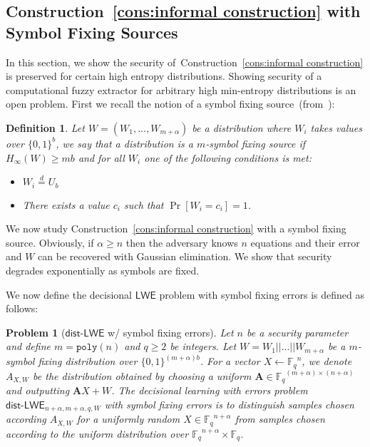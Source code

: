 \documentclass[11pt]{article}
\newcommand{\consref}[1]{\mbox{Construction~\ref{#1}}}
\newcommand{\class}[1]{{\ensuremath{\mathsf{#1}}}}
\newcommand{\vect}[1]{\ensuremath{\textbf{#1}}}
\newcommand{\Fq}{\ensuremath{\mathbb{F}_q}}
\newcommand{\poly}{\ensuremath{\mathtt{poly}}\xspace}
\newcommand{\LWE}{\class{LWE}}
\newcommand{\distLWE}{\ensuremath{\class{dist\mbox{-}LWE}}}
\newtheorem{definition}[theorem]{Definition}
\newtheorem{assumption}[theorem]{Assumption}
\newtheorem{problem}[theorem]{Problem}
\newcommand{\vA}{\vect{A}}
\newcommand{\ignore}[1]{}
\begin{document}
\subsection{\consref{cons:informal construction} with Symbol Fixing Sources}
\label{sec:LWE block fixing sources}
In this section, we show the security of~\consref{cons:informal construction} is preserved for certain high entropy distributions.  Showing security of a computational fuzzy extractor for arbitrary high min-entropy distributions is an open problem.  First we recall the notion of a symbol fixing source~(from~\cite{KZ07}): 
\begin{definition}
Let $W = (W_1,..., W_{m+\alpha})$ be a distribution where $W_i$ takes values over $\{0,1\}^b$, we say that a distribution is a $m$-\emph{symbol fixing source} if $H_\infty(W)\geq mb$ and for all $W_i$ one of the following conditions is met:
\begin{itemize}
\item $W_i \overset{d}= U_b$
\item There exists a value $c_i$ such that $\Pr[W_i = c_i] =1$.
\end{itemize}
\end{definition}

We now study \consref{cons:informal construction} with a symbol fixing source.  Obviously, if $\alpha \geq n$ then the adversary knows $n$ equations and their error and $W$ can be recovered with Gaussian elimination.  We show that security degrades exponentially as symbols are fixed.
\ignore{
\begin{assumption}[LWE w/ entropic errors]
Let $n$ be a security parameter and define $m = \poly(n)$ and $q\geq 2$ be integers.  Let $W = W_1||...||W_{m+\alpha}$ be a $m$-block fixing distribution over $\{0,1\}^{(m+\alpha)\ell}$. For a vector 
Let $A\in\Fq^{(m+\alpha)\times (n+\alpha)}$ and let $x\in\Fq^{n+\alpha}$.  No PPT algorithm given $Ax+W$ can recover $x$ with probability greater than nonnegligible.
\end{assumption}
}
We now define the decisional $\LWE$ problem with symbol fixing errors is defined as follows: 
\begin{problem}[$\distLWE$ w/ symbol fixing errors]
Let $n$ be a security parameter and define $m = \poly(n)$ and $q\geq 2$ be integers.  Let $W = W_1||...||W_{m+\alpha}$ be a $m$-symbol fixing distribution over $\{0,1\}^{(m+\alpha)b}$. For a vector $X \leftarrow \Fq^n$, we denote $A_{X, W}$ be the distribution obtained by choosing a uniform $\vA\in\Fq^{(m+\alpha)\times (n+\alpha)}$ and outputting $\vA X + W$. The decisional learning with errors problem $\distLWE_{n+\alpha, m+\alpha, q, W}$ with symbol fixing errors is to distinguish samples chosen according $A_{X, W}$ for a uniformly random $X \in \Fq^{n+\alpha}$ from samples chosen according to the uniform distribution over $\Fq^{n+\alpha} \times \Fq$.
\end{problem}
\end{document}
